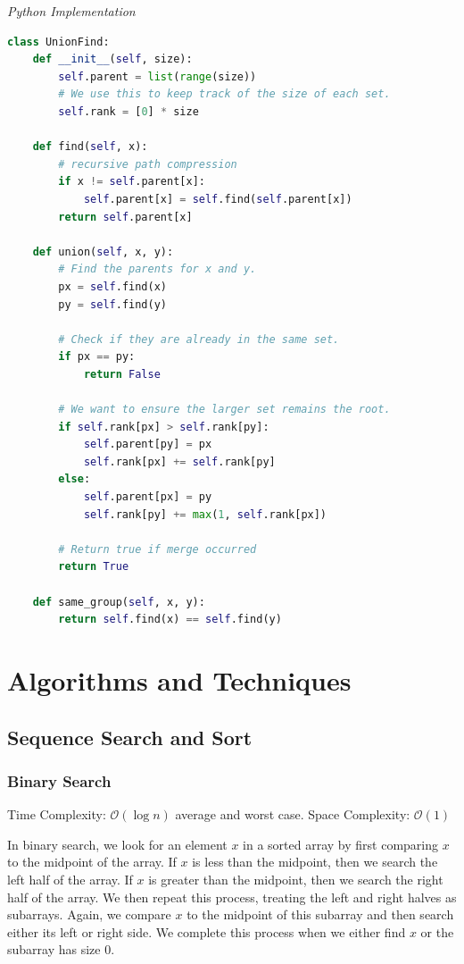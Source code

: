\documentclass{article}
\newcommand{\bigO}{\mathcal{O}}
\begin{document}
\vspace{8pt} \emph{Python Implementation}
\begin{lstlisting}[language=Python]
class UnionFind:
    def __init__(self, size):
        self.parent = list(range(size))
        # We use this to keep track of the size of each set.
        self.rank = [0] * size
        
    def find(self, x):
        # recursive path compression
        if x != self.parent[x]:
            self.parent[x] = self.find(self.parent[x])
        return self.parent[x]
        
    def union(self, x, y):
        # Find the parents for x and y.
        px = self.find(x)
        py = self.find(y)
        
        # Check if they are already in the same set.
        if px == py:
            return False
        
        # We want to ensure the larger set remains the root.
        if self.rank[px] > self.rank[py]:
            self.parent[py] = px
            self.rank[px] += self.rank[py]
        else: 
            self.parent[px] = py
            self.rank[py] += max(1, self.rank[px])
        
        # Return true if merge occurred
        return True
        
    def same_group(self, x, y):
        return self.find(x) == self.find(y)
\end{lstlisting}

\newpage    
\section{Algorithms and Techniques}
    \subsection{Sequence Search and Sort}
    \subsubsection{Binary Search}
    Time Complexity: $\bigO(\log n)$ average and worst case.  Space Complexity: $\bigO(1)$
    
    In binary search, we look for an element $x$ in a sorted array by first comparing $x$ to the midpoint of the array. If $x$ is less than the midpoint, then we search the left half of the array. If $x$ is greater than the midpoint, then we search the right half of the array. We then repeat this process, treating the left and right halves as subarrays. Again, we compare $x$ to the midpoint of this subarray and then search either its left or right side. We complete this process when we either find $x$ or the subarray has size 0.
    
\end{document}
